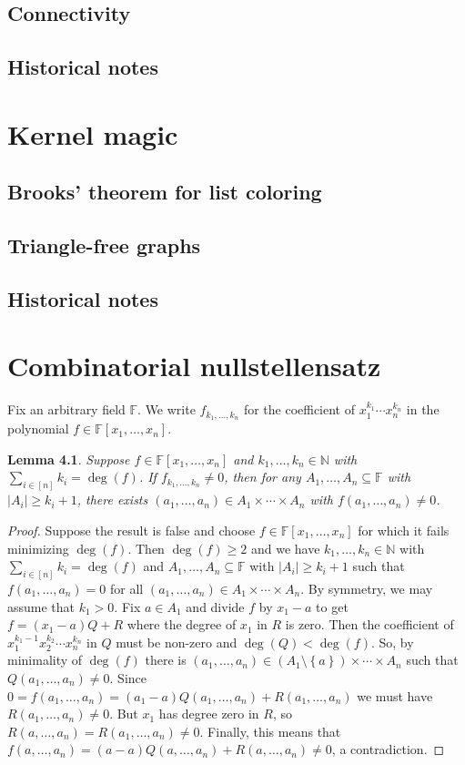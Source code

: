 \documentclass[openany]{tufte-book} %
\theoremstyle{plain}
\newtheorem{lemma}{Lemma}
\newcommand{\set}[1]{\left\{ #1 \right\}}
\newcommand{\card}[1]{\left|#1\right|}
\newcommand{\irange}[1]{\left[#1\right]}
\newcommand{\IN}{\mathbb{N}}
\begin{document}
\section{Connectivity}
\section{Historical notes}

\chapter{Kernel magic}
\section{Brooks' theorem for list coloring}
\section{Triangle-free graphs}
\section{Historical notes}

\chapter{Combinatorial nullstellensatz}
Fix an arbitrary field $\mathbb{F}$. We write $f_{k_1, \ldots, k_n}$ for the coefficient of $x_1^{k_1}\cdots x_n^{k_n}$ in the polynomial $f \in \mathbb{F}[x_1, \ldots, x_n]$. 
\begin{lemma}
Suppose $f \in \mathbb{F}[x_1, \ldots, x_n]$ and $k_1, \ldots, k_n \in \IN$ with $\sum_{i \in \irange{n}} k_i = \deg(f)$.  If $f_{k_1, \ldots, k_n} \ne 0$, then for any $A_1, \ldots, A_n \subseteq \mathbb{F}$ with $\card{A_i} \ge k_i + 1$, there exists $(a_1, \ldots, a_n) \in A_1 \times \cdots \times A_n$ with $f(a_1, \ldots, a_n) \ne 0$.
\end{lemma}
\begin{proof}
Suppose the result is false and choose $f \in \mathbb{F}[x_1, \ldots, x_n]$ for which it fails 
minimizing $\deg(f)$. Then $\deg(f) \ge 2$ and we have $k_1, \ldots, k_n \in \IN$ with $\sum_{i \in \irange{n}} k_i = \deg(f)$ and 
$A_1, \ldots, A_n \subseteq \mathbb{F}$ with $\card{A_i} \ge k_i + 1$ such that $f(a_1, \ldots, a_n) = 0$ for all $(a_1, \ldots, a_n) \in A_1 \times \cdots \times A_n$.  
By symmetry, we may assume that $k_1 > 0$.  Fix $a \in A_1$ and divide $f$ by $x_1 - a$ to get $f = (x_1 - a)Q + R$ where the degree of $x_1$ in $R$ is zero.  
Then the coefficient of $x_1^{k_1-1}x_2^{k_2} \cdots x_n^{k_n}$ in $Q$ must be non-zero and $\deg(Q) < \deg(f)$.  So, by minimality of $\deg(f)$ there 
is $(a_1, \ldots, a_n) \in (A_1 \setminus \set{a}) \times \cdots \times A_n$ such that $Q(a_1,\ldots, a_n) \ne 0$.  
Since $0 = f(a_1,\ldots, a_n) = (a_1 - a)Q(a_1,\ldots, a_n) + R(a_1,\ldots, a_n)$ we must have $R(a_1,\ldots, a_n) \ne 0$.  
But $x_1$ has degree zero in $R$, so $R(a,\ldots, a_n) = R(a_1,\ldots, a_n) \ne 0$.  
Finally, this means that $f(a,\ldots, a_n) = (a-a)Q(a,\ldots, a_n) + R(a,\ldots, a_n) \ne 0$, a contradiction.
\end{proof}
\end{document}
